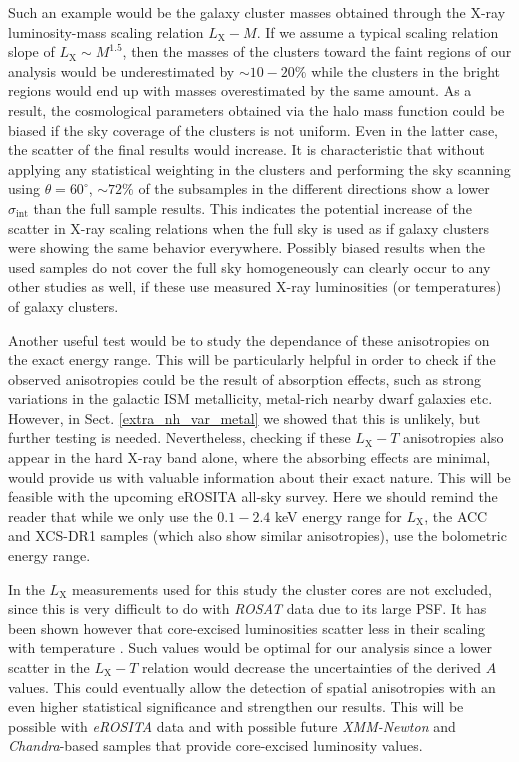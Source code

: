\documentclass{aa}   %
\begin{document}
Such an example would be the galaxy cluster masses obtained through the X-ray luminosity-mass scaling relation $L_{\text{X}}-M$. If we assume a typical scaling relation slope of $L_{\text{X}}\sim M^{1.5}$, then the masses of the clusters toward the faint regions of our analysis would be underestimated by $\sim 10-20\%$ while the clusters in the bright regions would end up with masses overestimated by the same amount. As a result, the cosmological parameters obtained via the halo mass function could be biased if the sky coverage of the clusters is not uniform. Even in the latter case, the scatter of the final results would increase. It is characteristic that without applying any statistical weighting in the clusters and performing the sky scanning using $\theta =60^{\circ}$, $\sim 72\%$ of the subsamples in the different directions show a lower $\sigma_{\text{int}}$ than the full sample results. This indicates the potential increase of the scatter in X-ray scaling relations when the full sky is used as if galaxy clusters were showing the same behavior everywhere. 
Possibly biased results when the used samples do not cover the full sky homogeneously can clearly occur to any other studies as well, if these use measured X-ray luminosities (or temperatures) of galaxy clusters. 

Another useful test would be to study the dependance of these anisotropies on the exact energy range. This will be particularly helpful in order to check if the observed anisotropies could be the result of absorption effects, such as strong variations in the galactic ISM metallicity, metal-rich nearby dwarf galaxies etc. However, in Sect. \ref{extra_nh_var_metal} we showed that this is unlikely, but further testing is needed. Nevertheless, checking if these $L_{\text{X}}-T$ anisotropies also appear in the hard X-ray band alone, where the absorbing effects are minimal, would provide us with valuable information about their exact nature. This will be feasible with the upcoming eROSITA all-sky survey. Here we should remind the reader that while we only use the $0.1-2.4$ keV energy range for $L_{\text{X}}$, the ACC and XCS-DR1 samples (which also show similar anisotropies), use the bolometric energy range. 

In the $L_{\text{X}}$ measurements used for this study the cluster cores are not excluded, since this is very difficult to do with \textit{ROSAT} data due to its large PSF. It has been shown however that core-excised luminosities scatter less in their scaling with temperature \citep[e.g.,][etc.]{markev,pratt,maughan}. Such values would be optimal for our analysis since a lower scatter in the $L_{\text{X}}-T$ relation would decrease the uncertainties of the derived $A$ values. This could eventually allow the detection of spatial anisotropies with an even higher statistical significance and strengthen our results. This will be possible with \textit{eROSITA} data and with possible future \textit{XMM-Newton} and \textit{Chandra}-based samples that provide core-excised luminosity values.
\end{document}

